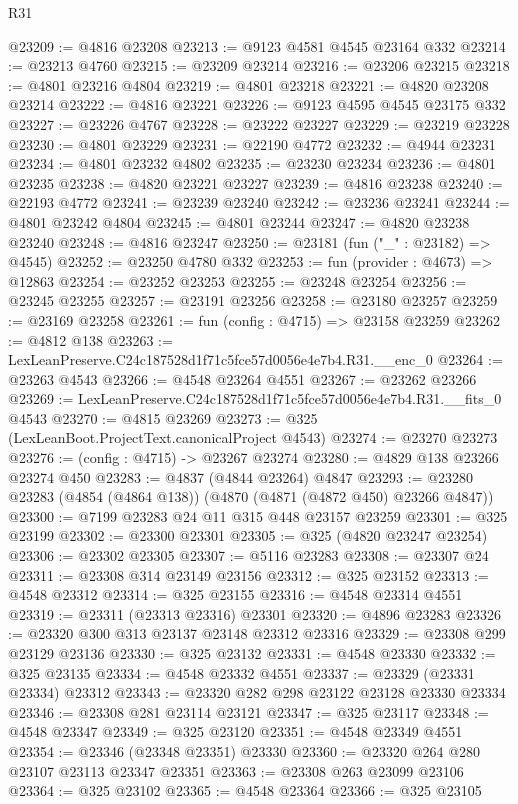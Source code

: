 \begin{lexlean}{R31}
\begin{coremodule}
@23209 := @4816 @23208
@23213 := @9123 @4581 @4545 @23164 @332
@23214 := @23213 @4760
@23215 := @23209 @23214
@23216 := @23206 @23215
@23218 := @4801 @23216 @4804
@23219 := @4801 @23218
@23221 := @4820 @23208 @23214
@23222 := @4816 @23221
@23226 := @9123 @4595 @4545 @23175 @332
@23227 := @23226 @4767
@23228 := @23222 @23227
@23229 := @23219 @23228
@23230 := @4801 @23229
@23231 := @22190 @4772
@23232 := @4944 @23231
@23234 := @4801 @23232 @4802
@23235 := @23230 @23234
@23236 := @4801 @23235
@23238 := @4820 @23221 @23227
@23239 := @4816 @23238
@23240 := @22193 @4772
@23241 := @23239 @23240
@23242 := @23236 @23241
@23244 := @4801 @23242 @4804
@23245 := @4801 @23244
@23247 := @4820 @23238 @23240
@23248 := @4816 @23247
@23250 := @23181 (fun ("_" : @23182) => @4545)
@23252 := @23250 @4780 @332
@23253 := fun (provider : @4673) => @12863
@23254 := @23252 @23253
@23255 := @23248 @23254
@23256 := @23245 @23255
@23257 := @23191 @23256
@23258 := @23180 @23257
@23259 := @23169 @23258
@23261 := fun (config : @4715) => @23158 @23259
@23262 := @4812 @138
@23263 := LexLeanPreserve.C24c187528d1f71c5fce57d0056e4e7b4.R31.__enc_0
@23264 := @23263 @4543
@23266 := @4548 @23264 @4551
@23267 := @23262 @23266
@23269 := LexLeanPreserve.C24c187528d1f71c5fce57d0056e4e7b4.R31.__fits_0 @4543
@23270 := @4815 @23269
@23273 := @325 (LexLeanBoot.ProjectText.canonicalProject @4543)
@23274 := @23270 @23273
@23276 := (config : @4715) -> @23267 @23274
@23280 := @4829 @138 @23266 @23274 @450
@23283 := @4837 (@4844 @23264) @4847
@23293 := @23280 @23283 (@4854 (@4864 @138)) (@4870 (@4871 (@4872 @450) @23266 @4847))
@23300 := @7199 @23283 @24 @11 @315 @448 @23157 @23259
@23301 := @325 @23199
@23302 := @23300 @23301
@23305 := @325 (@4820 @23247 @23254)
@23306 := @23302 @23305
@23307 := @5116 @23283
@23308 := @23307 @24
@23311 := @23308 @314 @23149 @23156
@23312 := @325 @23152
@23313 := @4548 @23312
@23314 := @325 @23155
@23316 := @4548 @23314 @4551
@23319 := @23311 (@23313 @23316) @23301
@23320 := @4896 @23283
@23326 := @23320 @300 @313 @23137 @23148 @23312 @23316
@23329 := @23308 @299 @23129 @23136
@23330 := @325 @23132
@23331 := @4548 @23330
@23332 := @325 @23135
@23334 := @4548 @23332 @4551
@23337 := @23329 (@23331 @23334) @23312
@23343 := @23320 @282 @298 @23122 @23128 @23330 @23334
@23346 := @23308 @281 @23114 @23121
@23347 := @325 @23117
@23348 := @4548 @23347
@23349 := @325 @23120
@23351 := @4548 @23349 @4551
@23354 := @23346 (@23348 @23351) @23330
@23360 := @23320 @264 @280 @23107 @23113 @23347 @23351
@23363 := @23308 @263 @23099 @23106
@23364 := @325 @23102
@23365 := @4548 @23364
@23366 := @325 @23105

\end{coremodule}
\end{lexlean}
